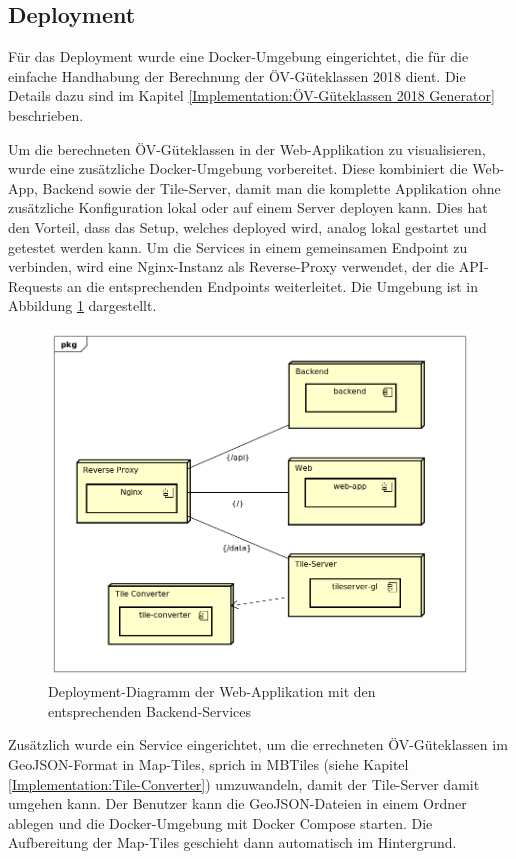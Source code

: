 \subsection{Deployment}
\label{Infrastruktur:Deployment}

Für das Deployment wurde eine Docker-Umgebung eingerichtet, die für die einfache Handhabung der Berechnung der \gls{ÖV-Güteklassen} 2018 dient.
Die Details dazu sind im Kapitel \ref{Implementation:ÖV-Güteklassen 2018 Generator} beschrieben.

Um die berechneten \gls{ÖV-Güteklassen} in der Web-Applikation zu visualisieren, wurde eine zusätzliche Docker-Umgebung vorbereitet.
Diese kombiniert die Web-App, Backend sowie der Tile-Server, damit man die komplette Applikation ohne zusätzliche Konfiguration lokal oder auf einem Server deployen kann.
Dies hat den Vorteil, dass das Setup, welches deployed wird, analog lokal gestartet und getestet werden kann.
Um die Services in einem gemeinsamen Endpoint zu verbinden, wird eine Nginx-Instanz als Reverse-Proxy verwendet, der die \acs{API}-Requests an die entsprechenden Endpoints weiterleitet.
Die Umgebung ist in Abbildung \ref{fig:deployment_web-app} dargestellt.

\begin{figure}[ht]
    \centering
    \includegraphics[width=0.8\linewidth]{projectdoc/img/deployment_web-app}
    \caption[Deployment-Diagramm der Web-Applikation]{Deployment-Diagramm der Web-Applikation mit den entsprechenden Backend-Services}
    \label{fig:deployment_web-app}
\end{figure}

Zusätzlich wurde ein Service eingerichtet, um die errechneten \gls{ÖV-Güteklassen} im \gls{GeoJSON}-Format in Map-Tiles, sprich in MBTiles (siehe Kapitel \ref{Implementation:Tile-Converter}) umzuwandeln, damit der Tile-Server damit umgehen kann.
Der Benutzer kann die \gls{GeoJSON}-Dateien in einem Ordner ablegen und die Docker-Umgebung mit Docker Compose starten.
Die Aufbereitung der Map-Tiles geschieht dann automatisch im Hintergrund.

